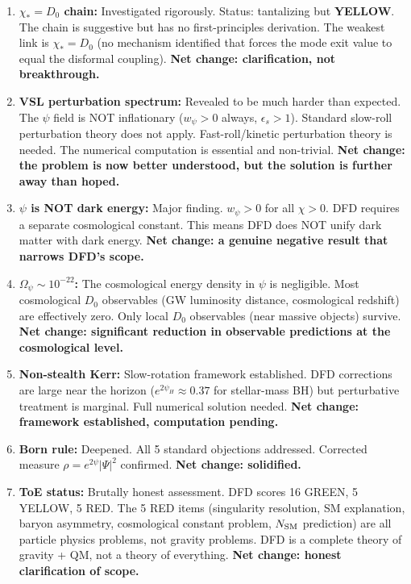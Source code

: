 \documentclass[11pt,a4paper]{article}
\newcommand{\YELLOW}{\textcolor{dfdyellow}{\textbf{YELLOW}}}
\begin{document}
\begin{enumerate}
\item \textbf{$\chi_* = D_0$ chain:} Investigated rigorously. Status: tantalizing but \YELLOW. The chain is suggestive but has no first-principles derivation. The weakest link is $\chi_* = D_0$ (no mechanism identified that forces the mode exit value to equal the disformal coupling). \textbf{Net change: clarification, not breakthrough.}

\item \textbf{VSL perturbation spectrum:} Revealed to be much harder than expected. The $\psi$ field is NOT inflationary ($w_\psi > 0$ always, $\epsilon_s > 1$). Standard slow-roll perturbation theory does not apply. Fast-roll/kinetic perturbation theory is needed. The numerical computation is essential and non-trivial. \textbf{Net change: the problem is now better understood, but the solution is further away than hoped.}

\item \textbf{$\psi$ is NOT dark energy:} Major finding. $w_\psi > 0$ for all $\chi > 0$. DFD requires a separate cosmological constant. This means DFD does NOT unify dark matter with dark energy. \textbf{Net change: a genuine negative result that narrows DFD's scope.}

\item \textbf{$\Omega_\psi \sim 10^{-22}$:} The cosmological energy density in $\psi$ is negligible. Most cosmological $D_0$ observables (GW luminosity distance, cosmological redshift) are effectively zero. Only local $D_0$ observables (near massive objects) survive. \textbf{Net change: significant reduction in observable predictions at the cosmological level.}

\item \textbf{Non-stealth Kerr:} Slow-rotation framework established. DFD corrections are large near the horizon ($e^{2\psi_H} \approx 0.37$ for stellar-mass BH) but perturbative treatment is marginal. Full numerical solution needed. \textbf{Net change: framework established, computation pending.}

\item \textbf{Born rule:} Deepened. All 5 standard objections addressed. Corrected measure $\rho = e^{2\psi}|\Psi|^2$ confirmed. \textbf{Net change: solidified.}

\item \textbf{ToE status:} Brutally honest assessment. DFD scores 16 GREEN, 5 YELLOW, 5 RED. The 5 RED items (singularity resolution, SM explanation, baryon asymmetry, cosmological constant problem, $N_{\rm SM}$ prediction) are all particle physics problems, not gravity problems. DFD is a complete theory of gravity + QM, not a theory of everything. \textbf{Net change: honest clarification of scope.}


\end{enumerate}
\end{document}

